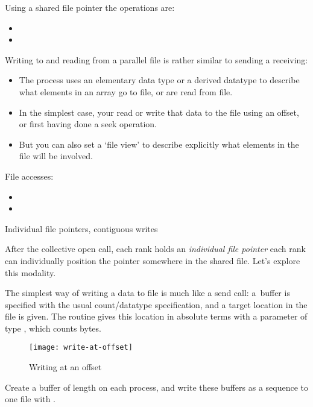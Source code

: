 Using a shared file pointer the operations are:
\begin{itemize}
\item {}
\item {}
\end{itemize}

Writing to and reading from a parallel file is rather similar to
sending a receiving:
\begin{itemize}
\item The process uses an elementary data type or a derived datatype
  to describe what elements in an array go to file, or are read from
  file.
\item In the simplest case, your read or write that data to the file using an
  offset, or first having done a seek operation.
\item But you can also set a `file view' to describe explicitly what
  elements in the file will be involved.
\end{itemize}

File accesses:
\begin{itemize}
\item {}
\item {}
\end{itemize}

 {Individual file pointers, contiguous writes}

After the collective open call, each rank holds an
\emph{individual file pointer}
each rank can individually position the pointer somewhere in the shared file.
Let's explore this modality.

The simplest way of writing a data to file is much like a send call:
a~buffer is specified with the usual count/datatype specification,
and a target location in the file is given.
The routine  gives this location
in absolute terms with a parameter of type ,
which counts bytes.

\begin{figure}[ht]
  \label{fig:write-at}
  \caption{Writing at an offset}
  \texttt{[image: write-at-offset]}
\end{figure}

\begin{exercise}
  \label{ex:blockwrite}
  Create a buffer of length  on each process, and write
  these buffers as a sequence to one file with .
\end{exercise}


